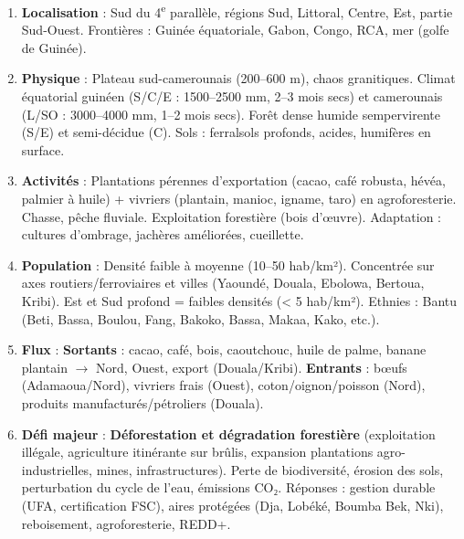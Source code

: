 \documentclass[11pt]{article}
\begin{document}
\begin{corrige}
\begin{enumerate}
    \item \textbf{Localisation} : Sud du 4\textsuperscript{e} parallèle, régions Sud, Littoral, Centre, Est, partie Sud-Ouest. Frontières : Guinée équatoriale, Gabon, Congo, RCA, mer (golfe de Guinée).
    \item \textbf{Physique} : Plateau sud-camerounais (200--600 m), chaos granitiques. Climat équatorial guinéen (S/C/E : 1500--2500 mm, 2--3 mois secs) et camerounais (L/SO : 3000--4000 mm, 1--2 mois secs). Forêt dense humide sempervirente (S/E) et semi-décidue (C). Sols : ferralsols profonds, acides, humifères en surface.
    \item \textbf{Activités} : Plantations pérennes d'exportation (cacao, café robusta, hévéa, palmier à huile) + vivriers (plantain, manioc, igname, taro) en agroforesterie. Chasse, pêche fluviale. Exploitation forestière (bois d'œuvre). Adaptation : cultures d'ombrage, jachères améliorées, cueillette.
    \item \textbf{Population} : Densité faible à moyenne (10--50 hab/km²). Concentrée sur axes routiers/ferroviaires et villes (Yaoundé, Douala, Ebolowa, Bertoua, Kribi). Est et Sud profond = faibles densités (< 5 hab/km²). Ethnies : Bantu (Beti, Bassa, Boulou, Fang, Bakoko, Bassa, Makaa, Kako, etc.).
    \item \textbf{Flux} : \textbf{Sortants} : cacao, café, bois, caoutchouc, huile de palme, banane plantain $\rightarrow$ Nord, Ouest, export (Douala/Kribi). \textbf{Entrants} : bœufs (Adamaoua/Nord), vivriers frais (Ouest), coton/oignon/poisson (Nord), produits manufacturés/pétroliers (Douala).
    \item \textbf{Défi majeur} : \textbf{Déforestation et dégradation forestière} (exploitation illégale, agriculture itinérante sur brûlis, expansion plantations agro-industrielles, mines, infrastructures). Perte de biodiversité, érosion des sols, perturbation du cycle de l'eau, émissions CO₂. Réponses : gestion durable (UFA, certification FSC), aires protégées (Dja, Lobéké, Boumba Bek, Nki), reboisement, agroforesterie, REDD+.
\end{enumerate}
\end{corrige}
\end{document}
